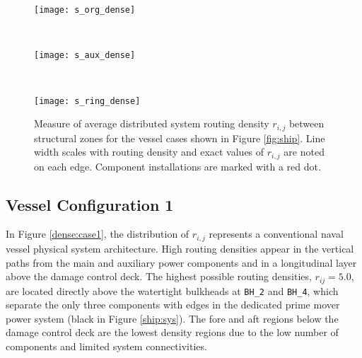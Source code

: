 \documentclass[preprint,12pt]{elsarticle}
\begin{document}
\begin{figure}
	\centering
	\begin{minipage}{1\linewidth}
		\centering
		\texttt{[image: s\_org\_dense]}
		\label{dense:case1}
	\end{minipage}\\[1ex]
	\begin{minipage}{1\linewidth}
		\centering
		\texttt{[image: s\_aux\_dense]}
		\label{dense:case2}
	\end{minipage}\\[1ex]
	\begin{minipage}{1\linewidth}
		\centering
		\texttt{[image: s\_ring\_dense]}
		\label{dense:case3}
	\end{minipage}%
	
	\caption{Measure of average distributed system routing density $r_{i,j}$ between structural zones for the vessel cases shown in Figure \ref{fig:ship}. Line width scales with routing density and exact values of $r_{i,j}$ are noted on each edge. Component installations are marked with a red dot. }
	\label{fig:routedensity}
\end{figure}  

\subsection{Vessel Configuration 1}
In Figure \ref{dense:case1}, the distribution of $r_{i,j}$ represents a conventional naval vessel physical system architecture. High routing densities appear in the vertical paths from the main and auxiliary power components and in a longitudinal layer above the damage control deck. The highest possible routing densities, $r_{ij}=5.0$, are located directly above the watertight bulkheads at \texttt{BH\_2} and \texttt{BH\_4}, which separate the only three components with edges in the dedicated prime mover power system (black in Figure \ref{ship:sys}). The fore and aft regions below the damage control deck are the lowest density regions due to the low number of components and limited system connectivities.
\end{document}
